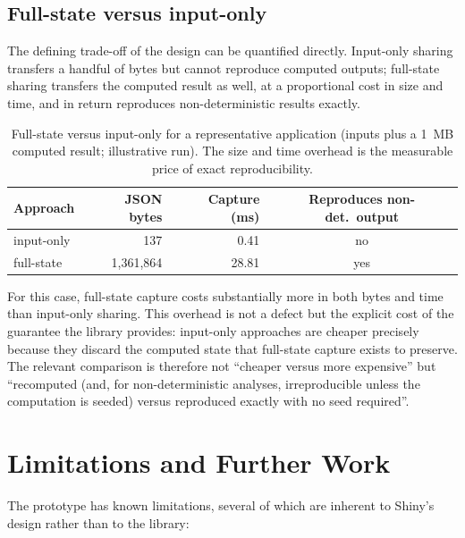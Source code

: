\documentclass[11pt,a4paper]{article}
\begin{document}
\subsection{Full-state versus input-only}

The defining trade-off of the design can be quantified directly. Input-only
sharing transfers a handful of bytes but cannot reproduce computed outputs;
full-state sharing transfers the computed result as well, at a proportional cost
in size and time, and in return reproduces non-deterministic results exactly.

\begin{table}[h]
\centering
\begin{tabular}{lrrc}
\toprule
\textbf{Approach} & \textbf{JSON bytes} & \textbf{Capture (ms)} & \textbf{Reproduces non-det.\ output} \\
\midrule
input-only  & 137        & 0.41  & no  \\
full-state  & 1{,}361{,}864 & 28.81 & yes \\
\bottomrule
\end{tabular}
\caption{Full-state versus input-only for a representative application
(inputs plus a 1~MB computed result; illustrative run). The size and time
overhead is the measurable price of exact reproducibility.}
\label{tab:bench-tradeoff}
\end{table}

For this case, full-state capture costs substantially more in both bytes and time
than input-only sharing. This overhead is not a defect but the explicit cost of
the guarantee the library provides: input-only approaches are cheaper precisely
because they discard the computed state that full-state capture exists to
preserve. The relevant comparison is therefore not ``cheaper versus more
expensive'' but ``recomputed (and, for non-deterministic analyses, irreproducible
unless the computation is seeded) versus reproduced exactly with no seed
required''.

\section{Limitations and Further Work}

The prototype has known limitations, several of which are inherent to Shiny's
design rather than to the library:
\end{document}

